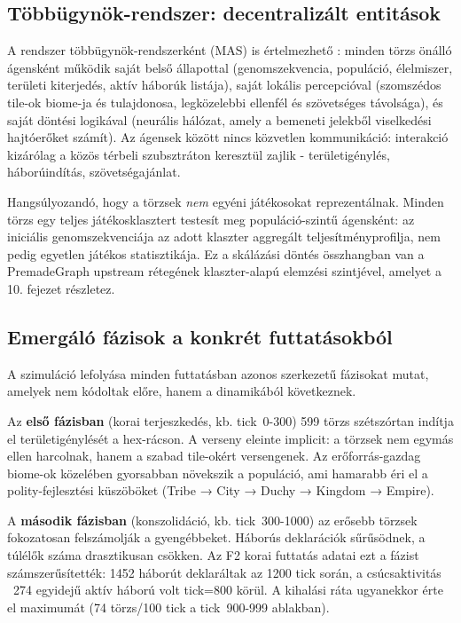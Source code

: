 ﻿\documentclass[a4paper,12pt]{report}
\begin{document}
\subsection*{Többügynök-rendszer: decentralizált entitások}

A rendszer többügynök-rendszerként (MAS) is értelmezhető \cite{wooldridgejennings1995}:
minden törzs önálló ágensként működik saját belső állapottal (genomszekvencia, populáció,
élelmiszer, területi kiterjedés, aktív háborúk listája), saját lokális percepcióval
(szomszédos tile-ok biome-ja és tulajdonosa, legközelebbi ellenfél és szövetséges távolsága),
és saját döntési logikával (neurális hálózat, amely a bemeneti jelekből viselkedési hajtóerőket
számít). Az ágensek között nincs közvetlen kommunikáció: interakció kizárólag a közös
térbeli szubsztráton keresztül zajlik - területigénylés, háborúindítás, szövetségajánlat.

Hangsúlyozandó, hogy a törzsek \textit{nem} egyéni játékosokat reprezentálnak.
Minden törzs egy teljes játékosklasztert testesít meg populáció-szintű ágensként:
az iniciális genomszekvenciája az adott klaszter aggregált teljesítményprofilja,
nem pedig egyetlen játékos statisztikája. Ez a skálázási döntés összhangban van
a PremadeGraph upstream rétegének klaszter-alapú elemzési szintjével,
amelyet a 10. fejezet részletez.

\subsection*{Emergáló fázisok a konkrét futtatásokból}

A szimuláció lefolyása minden futtatásban azonos szerkezetű fázisokat mutat,
amelyek nem kódoltak előre, hanem a dinamikából következnek.

Az \textbf{első fázisban} (korai terjeszkedés, kb. tick~0-300) 599 törzs szétszórtan
indítja el területigénylését a hex-rácson. A verseny eleinte implicit: a törzsek
nem egymás ellen harcolnak, hanem a szabad tile-okért versengenek. Az erőforrás-gazdag
biome-ok közelében gyorsabban növekszik a populáció, ami hamarabb éri el a polity-fejlesztési
küszöböket (Tribe → City → Duchy → Kingdom → Empire).

A \textbf{második fázisban} (konszolidáció, kb. tick~300-1000) az erősebb törzsek
fokozatosan felszámolják a gyengébbeket. Háborús deklarációk sűrűsödnek, a túlélők
száma drasztikusan csökken. Az F2 korai futtatás adatai ezt a fázist számszerűsítették:
1452 háborút deklaráltak az 1200 tick során, a csúcsaktivitás ~274 egyidejű aktív
háború volt tick=800 körül. A kihalási ráta ugyanekkor érte el maximumát
(74 törzs/100 tick a tick~900-999 ablakban).
\end{document}
